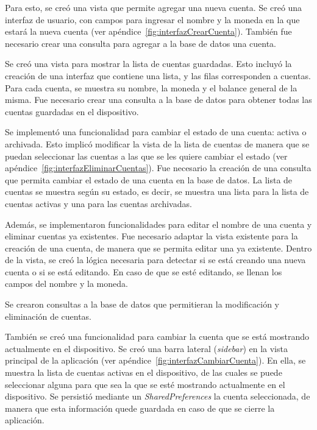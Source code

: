 Para esto, se creó una vista que permite agregar una nueva cuenta. Se creó una interfaz de usuario, con campos para ingresar el nombre y la moneda en la que estará la nueva cuenta (ver apéndice~\ref{fig:interfazCrearCuenta}). También fue necesario crear una consulta para agregar a la base de datos una cuenta.

Se creó una vista para mostrar la lista de cuentas guardadas. Esto incluyó la creación de una interfaz que contiene una lista, y las filas corresponden a cuentas. Para cada cuenta, se muestra su nombre, la moneda y el balance general de la misma. Fue necesario crear una consulta a la base de datos para obtener todas las cuentas guardadas en el dispositivo.

Se implementó una funcionalidad para cambiar el estado de una cuenta: activa o archivada. Esto implicó modificar la vista de la lista de cuentas de manera que se puedan seleccionar las cuentas a las que se les quiere cambiar el estado (ver apéndice~\ref{fig:interfazEliminarCuentas}). Fue necesario la creación de una consulta que permita cambiar el estado de una cuenta en la base de datos. La lista de cuentas se muestra según su estado, es decir, se muestra una lista para la lista de cuentas activas y una para las cuentas archivadas. 

Además, se implementaron funcionalidades para editar el nombre de una cuenta y eliminar cuentas ya existentes. Fue necesario adaptar la vista existente para la creación de una cuenta, de manera que se permita editar una ya existente. Dentro de la vista, se creó la lógica necesaria para detectar si se está creando una nueva cuenta o si se está editando. En caso de que se esté editando, se llenan los campos del nombre y la moneda.

Se crearon consultas a la base de datos que permitieran la modificación y eliminación de cuentas.

También se creó una funcionalidad para cambiar la cuenta que se está mostrando actualmente en el dispositivo. Se creó una barra lateral (\textit{sidebar}) en la vista principal de la aplicación (ver apéndice~\ref{fig:interfazCambiarCuenta}). En ella, se muestra la lista de cuentas activas en el dispositivo, de las cuales se puede seleccionar alguna para que sea la que se esté mostrando actualmente en el dispositivo. Se persistió mediante un \textit{SharedPreferences} la cuenta seleccionada, de manera que esta información quede guardada en caso de que se cierre la aplicación.

